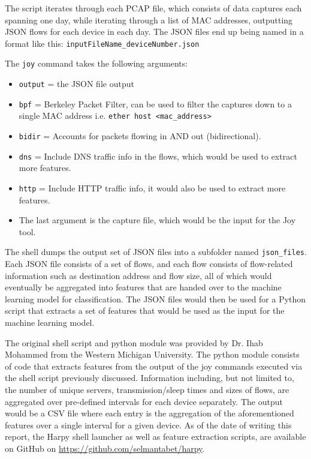\documentclass{article}
\begin{document}
The script iterates through each PCAP file, which consists of data
captures each spanning one day, while iterating through a list of MAC
addresses, outputting JSON flows for each device in each day. The JSON
files end up being named in a format like this: \texttt{inputFileName\_deviceNumber.json}\newline

The \texttt{joy} command takes the following arguments:

\begin{itemize}
\item \texttt{output} = the JSON file output
\item \texttt{bpf} = Berkeley Packet Filter, can be used to filter the captures down to
a single MAC address i.e. \texttt{ether host
\textless mac\_address\textgreater}
\item \texttt{bidir} = Accounts for packets flowing in AND out (bidirectional).
\item \texttt{dns} = Include DNS traffic info in the flows, which would be used to extract more features.
\item \texttt{http} = Include HTTP traffic info, it would also be used to extract more features.
\item The last argument is the capture file, which would be the input for the Joy tool.
\end{itemize}


The shell dumps the output set of JSON files into a subfolder named
\texttt{json\_files}. Each JSON file consists of a set of flows, and each
flow consists of flow-related information such as destination address
and flow size, all of which would eventually be aggregated into features that
are handed over to the machine learning model for classification. The
JSON files would then be used for a Python script that extracts a set of
features that would be used as the input for the machine learning model.\pagebreak

The original shell script and python module was provided by Dr. Ihab
Mohammed from the Western Michigan University. The python module consists
of code that extracts features from the output of the joy commands
executed via the shell script previously discussed. Information
including, but not limited to, the number of unique servers,
transmission/sleep times and sizes of flows, are aggregated over
pre-defined intervals for each device separately. The output would be a
CSV file where each entry is the aggregation of the aforementioned
features over a single interval for a given device. As of the date of writing this report, the Harpy shell launcher as well as feature extraction scripts, are available on GitHub on \url{https://github.com/selmantabet/harpy}.
\end{document}
